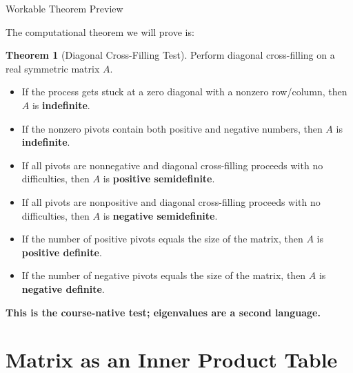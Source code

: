 \documentclass[10pt]{beamer}
\theoremstyle{definition}
\newtheorem{thm}{Theorem}[section]
\newcommand{\x}[1]{\alert{\textbf{#1}}}
\begin{document}
\begin{frame}[shrink=8]{Workable Theorem Preview}

The computational theorem we will prove is:

\vfill

\begin{thm}[Diagonal Cross-Filling Test]
Perform diagonal cross-filling on a real symmetric matrix $A$.
\begin{itemize}
\item If the process gets stuck at a zero diagonal with a nonzero row/column, then $A$ is \x{indefinite}.
\item If the nonzero pivots contain both positive and negative numbers, then $A$ is \x{indefinite}.
\item If all pivots are nonnegative and diagonal cross-filling proceeds with no difficulties, then $A$ is \x{positive semidefinite}.
\item If all pivots are nonpositive and diagonal cross-filling proceeds with no difficulties, then $A$ is \x{negative semidefinite}.
\item If the number of positive pivots equals the size of the matrix, then $A$ is \x{positive definite}.
\item If the number of negative pivots equals the size of the matrix, then $A$ is \x{negative definite}.
\end{itemize}
\end{thm}

\vfill

\begin{center}
\x{This is the course-native test; eigenvalues are a second language.}
\end{center}

\end{frame}


\section{Matrix as an Inner Product Table}
\end{document}
